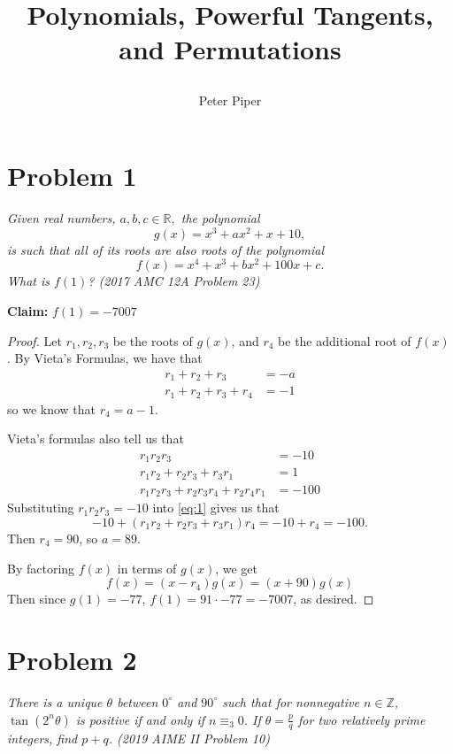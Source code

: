 \documentclass{article}
\title{
    \textbf{Polynomials, Powerful Tangents, and Permutations}
    \author{Peter Piper}
}
\begin{document}
\maketitle
\pagebreak

\section*{Problem 1}
\textit{Given real numbers, $a,b,c \in \mathbb{R},$ the polynomial \[g(x) = x^3 + ax^2 + x + 10,\] is such that all of its roots are also roots of the polynomial \[
f(x) = x^4 + x^3 + bx^2 + 100x + c.
\] What is $f(1)$? (2017 AMC 12A Problem 23)}


\textbf{Claim:} $f(1) = -7007$
\begin{proof}
    Let $r_1, r_2, r_3$ be the roots of $g(x)$, and  $r_4$ be the additional root of $f(x)$. By Vieta's Formulas, we have that  
    \begin{align*}
        r_1 + r_2+r_3 &= -a\\
        r_1+r_2+r_3+r_4 &= -1
    \end{align*}
    so we know that $r_4 = a - 1$.

    Vieta's formulas also tell us that 
    \begin{align*}
        r_1 r_2 r_3 &= -10\\
        r_1 r_2 + r_2 r_3 + r_3 r_1 &= 1\\ 
        r_1r_2r_3 + r_2r_3r_4 + r_2r_4r_1 &= -100 \label{eq:1}\tag{$\star$}
    \end{align*}
Substituting $r_1r_2r_3 = -10$ into \ref{eq:1} gives us that \[
    -10 + (r_1r_2 + r_2r_3 + r_3r_1)r_4 = -10 + r_4 = -100.
    \] Then $r_4 = 90$, so $a = 89$.

    By factoring  $f(x)$ in terms of  $g(x)$, we get  \[
    f(x) = (x-r_4)g(x) = \left(x + 90\right) g(x)
    \] 
    Then since $g(1) = -77$,  $f(1) = 91 \cdot -77 = -7007$, as desired.
\end{proof}

\pagebreak

\section*{Problem 2}
\textit{There is a unique $\theta$ between  $0^\circ$ and $90^\circ$ such that for nonnegative  $n \in \mathbb{Z}$, $\tan(2^n \theta)$ is positive if and only if  $n \equiv_3 0$. If  $\theta = \frac{p}{q}$ for two relatively prime integers, find  $p + q$. (2019 AIME II Problem 10)}
\end{document}
